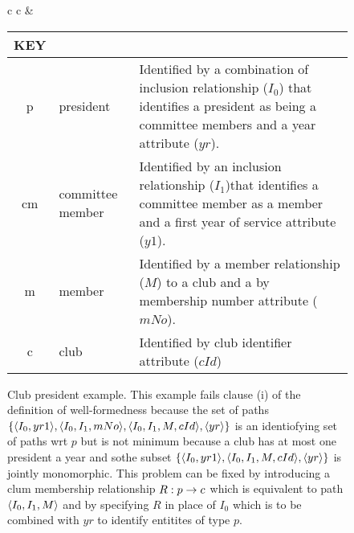 \documentclass[10pt,a4paper]{article}
\newcommand{\set}[1]{\left\{#1\right\}}
\begin{document}
\begin{figure} [h]
\begin{center}
\begin{tabular}{c c}
\idcomp
{}
\idcomp
{}
\idcomp
{}
\idcomp
{}
\idcomp
{}
\idcomp
{}
\idcomp
& \footnotesize
\begin{tabular}{c p{1.5cm} p{4cm}}
KEY && \\
\hline
p  & president        & Identified by a combination of inclusion relationship ($I_0$) that identifies a
                       president as being a committee members and a year attribute ($yr$). \\
cm & committee member & Identified by an inclusion relationship ($I_1$)that identifies a committee member 
                         as a member and a first year of service attribute ($y1$).\\
m  & member           & Identified by a member relationship ($M$) to a club and a by membership 
                         number attribute ($mNo$). \\
c  & club             & Identified by club identifier attribute ($cId$)
\end{tabular} 
\end{tabular}
\end{center}
\caption{Club president example. This example fails clause (i) of the definition of well-formedness because
the set of paths $\set{\tuple{I_0,yr1},\tuple{I_0,I_1,mNo}, \tuple{I_0,I_1,M,cId}, \tuple{yr}}$ is 
an identiofying set of paths wrt $p$ but is not minimum because a club has at most one president a year and sothe subset $\set{\tuple{I_0,yr1}, \tuple{I_0,I_1,M,cId}, \tuple{yr}}$ is jointly monomorphic. 
This problem can be fixed by introducing a clum membership relationship $R: p \rightarrow c$ which is equivalent to
path $\langle I_0,I_1,M\rangle$ and by specifying $R$ in place of $I_0$ which is to be combined with $yr$ to identify entitites of type $p$.
}
\label{clubpresidentbeforenormalisation}
\end{figure}
\end{document}
